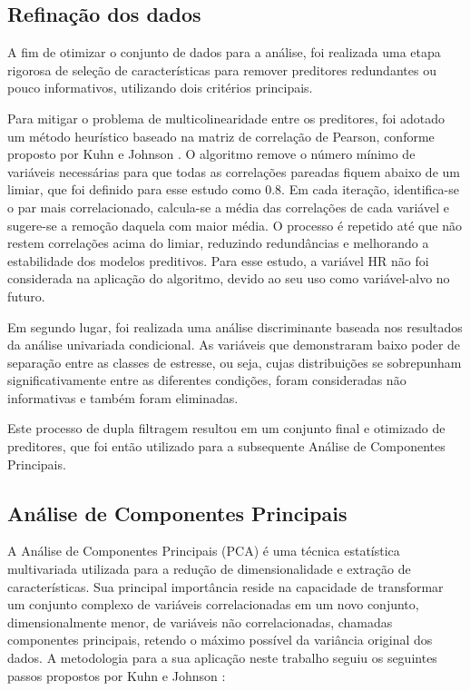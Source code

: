 \documentclass[conference]{IEEEtran}
\begin{document}
\subsection{Refinação dos dados}
A fim de otimizar o conjunto de dados para a análise, foi realizada uma etapa rigorosa de seleção de características para remover preditores redundantes ou pouco informativos, utilizando dois critérios principais.

Para mitigar o problema de multicolinearidade entre os preditores, foi adotado um método heurístico baseado na matriz de correlação de Pearson, conforme proposto por Kuhn e Johnson \cite{b8}. O algoritmo remove o número mínimo de variáveis necessárias para que todas as correlações pareadas fiquem abaixo de um limiar, que foi definido para esse estudo como $0.8$. Em cada iteração, identifica-se o par mais correlacionado, calcula-se a média das correlações de cada variável e sugere-se a remoção daquela com maior média. O processo é repetido até que não restem correlações acima do limiar, reduzindo redundâncias e melhorando a estabilidade dos modelos preditivos. Para esse estudo, a variável HR não foi considerada na aplicação do algoritmo, devido ao seu uso como variável-alvo no futuro.

Em segundo lugar, foi realizada uma análise discriminante baseada nos resultados da análise univariada condicional. As variáveis que demonstraram baixo poder de separação entre as classes de estresse, ou seja, cujas distribuições se sobrepunham significativamente entre as diferentes condições, foram consideradas não informativas e também foram eliminadas.

Este processo de dupla filtragem resultou em um conjunto final e otimizado de preditores, que foi então utilizado para a subsequente Análise de Componentes Principais.

\subsection{Análise de Componentes Principais}

A Análise de Componentes Principais (PCA) é uma técnica estatística multivariada utilizada para a redução de dimensionalidade e extração de características. Sua principal importância reside na capacidade de transformar um conjunto complexo de variáveis correlacionadas em um novo conjunto, dimensionalmente menor, de variáveis não correlacionadas, chamadas componentes principais, retendo o máximo possível da variância original dos dados. A metodologia para a sua aplicação neste trabalho seguiu os seguintes passos propostos por Kuhn e Johnson \cite{b8}:
\end{document}
